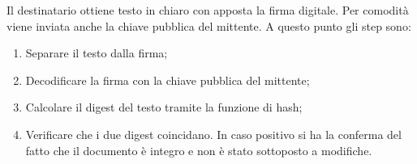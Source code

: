 Il destinatario ottiene testo in chiaro con apposta la firma digitale.
Per comodità viene inviata anche la chiave pubblica del mittente. A
questo punto gli step sono:

\begin{enumerate}
    \item Separare il testo dalla firma;
    \item Decodificare la firma con la chiave pubblica del mittente;
    \item Calcolare il digest del testo tramite la funzione di hash;
    \item Verificare che i due digest coincidano. In caso positivo si ha
          la conferma del fatto che il documento è integro e non è stato
          sottoposto a modifiche.
\end{enumerate}